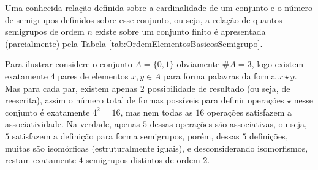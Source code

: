 Uma conhecida relação definida sobre a cardinalidade de um conjunto e o número de semigrupos definidos sobre esse conjunto, ou seja, a relação de quantos semigrupos de ordem $n$ existe sobre um conjunto finito é apresentada (parcialmente) pela Tabela \ref{tab:OrdemElementosBasicosSemigrupo}.

\begin{exemplo}
  Para ilustrar considere o conjunto $A = \{0, 1\}$ obviamente $\# A = 3$, logo existem exatamente $4$ pares de elementos $x, y \in A$ para forma palavras da forma $x \star y$. Mas para cada par, existem apenas $2$ possibilidade de resultado (ou seja, de reescrita), assim o número total de formas possíveis para definir operações $\star$ nesse conjunto é exatamente $4^2 = 16$, mas nem todas as $16$ operações satisfazem a associatividade. Na verdade, apenas $5$ dessas operações são associativas, ou seja, $5$ satisfazem a definição para forma semigrupos, porém, dessas $5$ definições, muitas são isomórficas (estruturalmente iguais), e desconsiderando isomorfismos, restam exatamente $4$ semigrupos distintos de ordem $2$. 
\end{exemplo}
